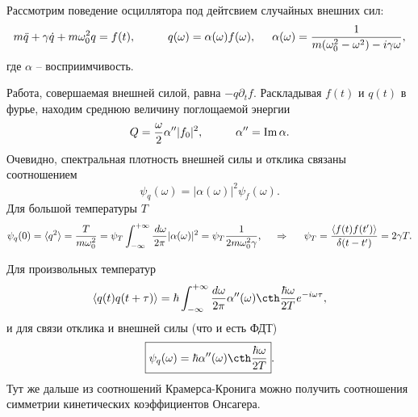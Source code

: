 Рассмотрим поведение осциллятора под дейтсвием случайных внешних сил:
\begin{equation*}
	m \ddot{q} + \gamma \dot{q} + m \omega_0^2 q = f(t),
	\hspace{10 mm} 
	q(\omega) = \alpha(\omega) f(\omega),
	\hspace{5 mm} 
	\alpha(\omega) = \frac{1}{m(\omega_0^2-\omega^2)-i \gamma \omega},
\end{equation*}
где $\alpha$ -- восприимчивость.

Работа, совершаемая внешней силой, равна $- q \partial_t f$. Раскладывая $f(t)$ и $q(t)$ в фурье, находим среднюю величину поглощаемой энергии
\begin{equation*}
	Q = \frac{\omega}{2}\alpha'' |f_0|^2,
	\hspace{10 mm} 
	\alpha'' = \Im \alpha.
\end{equation*}
Очевидно, спектральная плотность внешней силы и отклика связаны соотношением
\begin{equation*}
	\psi_q(\omega) = |\alpha(\omega)|^2 \psi_f (\omega).
\end{equation*}
Для большой температуры $T$
\begin{equation*}
	\psi_q(0) = \langle q^2\rangle = \frac{T}{m \omega_0^2} = \psi_T \int_{-\infty}^{+\infty} \frac{\, d \omega}{2\pi} |\alpha(\omega)|^2 = \psi_T \frac{1}{2m \omega_0^2 \gamma},
	\hspace{0.5cm} \Rightarrow \hspace{0.5cm}
	\psi_T = \frac{\langle f(t) f(t')\rangle}{\delta(t-t')} = 2 \gamma T.
\end{equation*}

Для произвольных температур
\begin{equation*}
	\langle q(t) q(t+\tau)\rangle = \hbar \int_{-\infty}^{+\infty} \frac{d \omega}{2\pi} \alpha''(\omega) \cth \frac{\hbar \omega}{2 T} e^{- i \omega \tau},
\end{equation*}
и для связи отклика и внешней силы (что и есть ФДТ)
\begin{equation}
	\boxed{\psi_q (\omega) = \hbar \alpha''(\omega) \cth \frac{\hbar \omega}{2T}}.
\end{equation}
Тут же дальше из соотношений Крамерса-Кронига можно получить соотношения симметрии кинетических коэффициентов Онсагера. 
